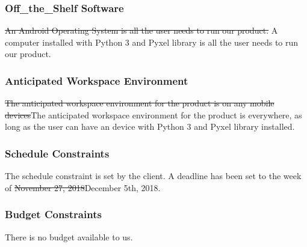 \documentclass[12pt, titlepage]{article}
\begin{document}
\subsubsection{Off\_the\_Shelf Software}
\sout{An Android Operating System is all the user needs to run our product.}{\color{red} A computer installed with Python 3 and Pyxel library is all the user needs to run our product.}
\subsubsection{Anticipated Workspace Environment}
\sout{The anticipated workspace environment for the product is on any mobile devices}{\color{red}The anticipated workspace environment for the product is everywhere, as long as the user can have an device with Python 3 and Pyxel library installed.}
\subsubsection{Schedule Constraints}
The schedule constraint is set by the client. A deadline has been set to the week of \sout{November 27, 2018}{\color{red}December 5th, 2018}. 
\subsubsection{Budget Constraints}
There is no budget available to us.
\end{document}
